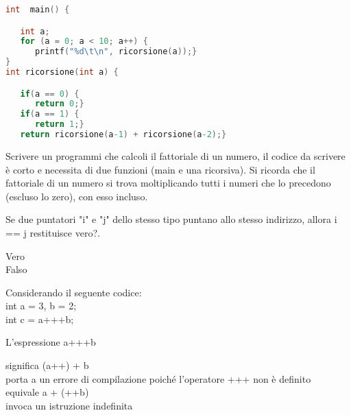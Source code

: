 \documentclass[addpoints,11pt]{exam}
\begin{document}
\begin{questions}
\begin{minipage}[t]{0.6\linewidth}
\begin{lstlisting}[language=C]
int  main() {

   int a;
   for (a = 0; a < 10; a++) {
      printf("%d\t\n", ricorsione(a));}
}
int ricorsione(int a) {

   if(a == 0) {
      return 0;}
   if(a == 1) {
      return 1;}
   return ricorsione(a-1) + ricorsione(a-2);}

\end{lstlisting}
\end{minipage}
\begin{minipage}[t]{0.4\linewidth}
	\makeemptybox{120pt}
\end{minipage}
\newpage

\newpage


\question[2]
Scrivere un programmi che calcoli il fattoriale di un numero, il codice da scrivere è corto e necessita di due funzioni (main e una ricorsiva). Si ricorda che il fattoriale di un numero si trova moltiplicando tutti i numeri che lo precedono (escluso lo zero), con esso incluso.\\
\begin{minipage}[t]{1\linewidth}
	\makeemptybox{220pt}
\end{minipage}

\question[2]
Se due puntatori "i" e "j" dello stesso tipo puntano allo stesso indirizzo, allora i == j restituisce vero?.

\begin{oneparcheckboxes}
	\choice Vero\\
	\choice Falso 
\end{oneparcheckboxes}


\question[2]
Considerando il seguente codice:\\

int a = 3, b = 2;\\
int c = a+++b;

L'espressione a+++b

\begin{oneparcheckboxes}
	\choice significa (a++) + b\\
	\choice porta a un errore di compilazione poiché l'operatore +++ non è definito\\
	\choice equivale a + (++b)\\
	\choice invoca un istruzione indefinita
\end{oneparcheckboxes}
 

\end{questions}
\end{document}
